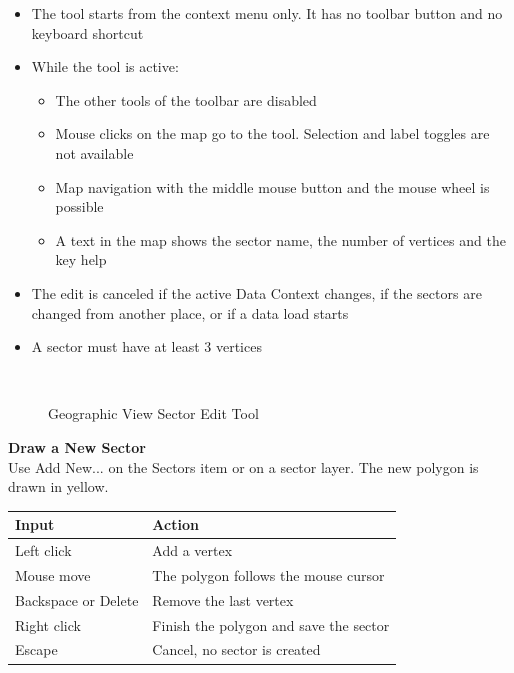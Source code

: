 \begin{itemize}
 \item The tool starts from the context menu only. It has no toolbar button and no keyboard shortcut
 \item While the tool is active:
 \begin{itemize}
  \item The other tools of the toolbar are disabled
  \item Mouse clicks on the map go to the tool. Selection and label toggles are not available
  \item Map navigation with the middle mouse button and the mouse wheel is possible
  \item A text in the map shows the sector name, the number of vertices and the key help
 \end{itemize}
 \item The edit is canceled if the active Data Context changes, if the sectors are changed from another place, or if a data load starts
 \item A sector must have at least 3 vertices
\end{itemize}
\ \\

\begin{figure}[H]
  \center
  \caption{Geographic View Sector Edit Tool}
\end{figure}

\textbf{Draw a New Sector} \\

Use Add New... on the Sectors item or on a sector layer. The new polygon is drawn in yellow.

\begin{center}
 \begin{tabularx}{\textwidth}{ | l | X |}
  \hline
  \textbf{Input} & \textbf{Action} \\
  \hline
  \hline
  Left click & Add a vertex \\
  \hline
  Mouse move & The polygon follows the mouse cursor \\
  \hline
  Backspace or Delete & Remove the last vertex \\
  \hline
  Right click & Finish the polygon and save the sector \\
  \hline
  Escape & Cancel, no sector is created \\
  \hline
 \end{tabularx}
\end{center}
\ \\

